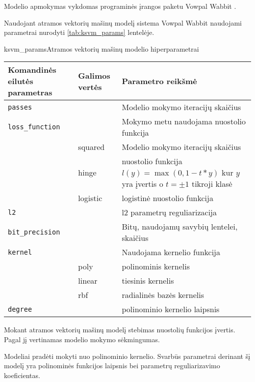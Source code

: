 
Modelio apmokymas vykdomas programinės įrangos paketu Vowpal Wabbit \cite{vw}.


Naudojant atramos vektorių mašinų modelį sistema Vowpal Wabbit naudojami parametrai nurodyti \vref{tab:ksvm_params} lentelėje.

\begin{ktutable}{ksvm_params}{Atramos vektorių mašinų modelio hiperparametrai}
    \begin{tabular}{| l | l | p{7cm}|}
    \hline
        Komandinės eilutės parametras & Galimos vertės & Parametro reikšmė\\ \hline
        \texttt{passes} &  & Modelio mokymo iteracijų skaičius \\ \hline
        \texttt{loss\_function} &          & Mokymo metu naudojama nuostolio funkcija \\
                               & squared  & Modelio mokymo iteracijų skaičius \\
                               & hinge    & nuostolio funkcija $l(y) = \max(0, 1 - t * y)$ kur $y$ yra įvertis o $t = \pm 1$ tikroji klasė  \\
                               & logistic & logistinė nuostolio funkcija \\ \hline
        \texttt{l2} & & l2 parametrų reguliarizacija \\ \hline
        \texttt{bit\_precision} & & Bitų, naudojamų savybių lentelei, skaičius\\ \hline
        \texttt{kernel} & & Naudojama kernelio funkcija   \\
                       & poly & polinominis kernelis     \\
                       & linear & tiesinis kernelis      \\
                       & rbf & radialinės bazės kernelis \\ \hline
        \texttt{degree} & & polinominio kernelio laipsnis \\ \hline
    \end{tabular}
\end{ktutable}

Mokant atramos vektorių mašinų modelį stebimas nuostolių funkcijos įvertis. Pagal jį vertinamas modelio mokymo sėkmingumas.

Modeliai pradėti mokyti nuo polinominio kernelio. Svarbūs parametrai derinant šį modelį yra polinominės funkcijos laipsnis bei parametrų reguliarizavimo koeficientas.

